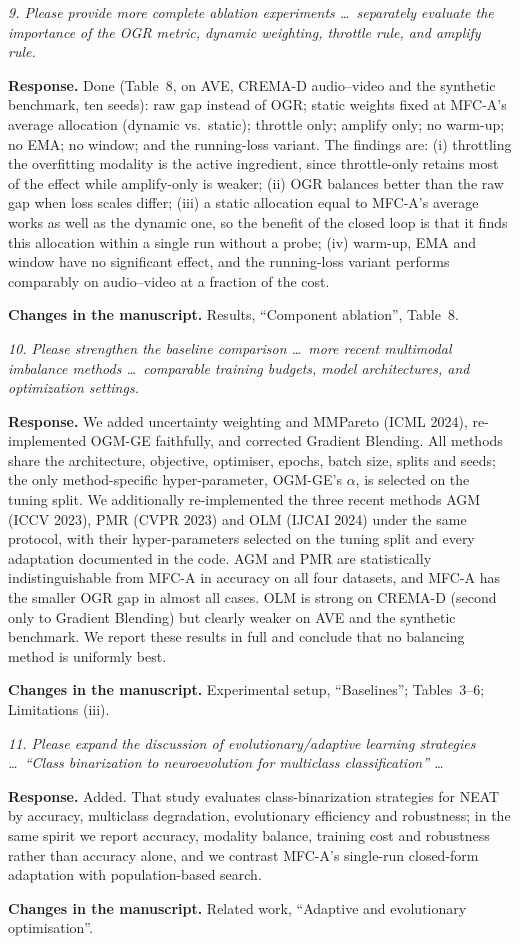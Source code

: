 \documentclass[11pt,a4paper]{article}
\newcommand{\rc}[1]{\par\noindent\colorbox{gray!12}{\parbox{\dimexpr\linewidth-2\fboxsep}{\small\textit{#1}}}\par}
\newcommand{\resp}{\par\noindent\textbf{Response.} }
\newcommand{\chg}{\par\noindent\textbf{Changes in the manuscript.} }
\begin{document}
\rc{9. Please provide more complete ablation experiments \ldots\ separately evaluate the importance of the OGR metric, dynamic weighting, throttle rule, and amplify rule.}
\resp Done (Table~8, on AVE, CREMA-D audio--video and the synthetic benchmark, ten seeds): raw gap instead of OGR; static weights fixed at MFC-A's average allocation (dynamic vs.\ static); throttle only; amplify only; no warm-up; no EMA; no window; and the running-loss variant. The findings are: (i) throttling the overfitting modality is the active ingredient, since throttle-only retains most of the effect while amplify-only is weaker; (ii) OGR balances better than the raw gap when loss scales differ; (iii) a static allocation equal to MFC-A's average works as well as the dynamic one, so the benefit of the closed loop is that it finds this allocation within a single run without a probe; (iv) warm-up, EMA and window have no significant effect, and the running-loss variant performs comparably on audio--video at a fraction of the cost.
\chg Results, ``Component ablation'', Table~8.

\rc{10. Please strengthen the baseline comparison \ldots\ more recent multimodal imbalance methods \ldots\ comparable training budgets, model architectures, and optimization settings.}
\resp We added uncertainty weighting and MMPareto (ICML 2024), re-implemented OGM-GE faithfully, and corrected Gradient Blending. All methods share the architecture, objective, optimiser, epochs, batch size, splits and seeds; the only method-specific hyper-parameter, OGM-GE's $\alpha$, is selected on the tuning split. We additionally re-implemented the three recent methods AGM (ICCV 2023), PMR (CVPR 2023) and OLM (IJCAI 2024) under the same protocol, with their hyper-parameters selected on the tuning split and every adaptation documented in the code. AGM and PMR are statistically indistinguishable from MFC-A in accuracy on all four datasets, and MFC-A has the smaller OGR gap in almost all cases. OLM is strong on CREMA-D (second only to Gradient Blending) but clearly weaker on AVE and the synthetic benchmark. We report these results in full and conclude that no balancing method is uniformly best.
\chg Experimental setup, ``Baselines''; Tables~3--6; Limitations (iii).

\rc{11. Please expand the discussion of evolutionary/adaptive learning strategies \ldots\ ``Class binarization to neuroevolution for multiclass classification'' \ldots}
\resp Added. That study evaluates class-binarization strategies for NEAT by accuracy, multiclass degradation, evolutionary efficiency and robustness; in the same spirit we report accuracy, modality balance, training cost and robustness rather than accuracy alone, and we contrast MFC-A's single-run closed-form adaptation with population-based search.
\chg Related work, ``Adaptive and evolutionary optimisation''.
\end{document}
